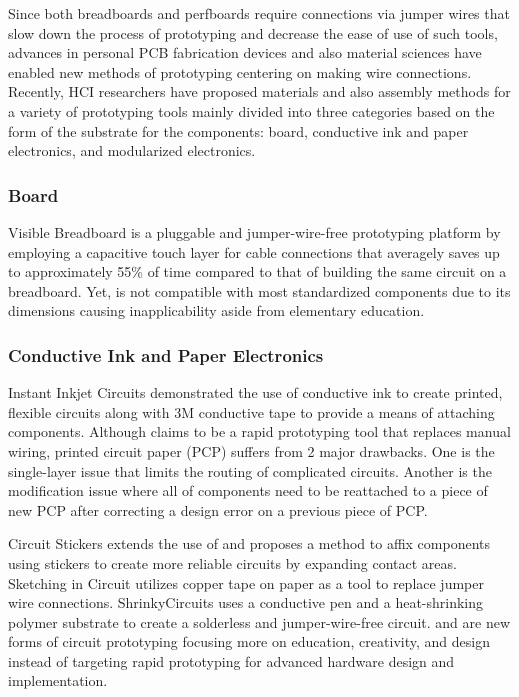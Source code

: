 Since both breadboards and perfboards require connections via jumper wires that slow down the process of prototyping and decrease the ease of use of such tools, advances in personal PCB fabrication devices and also material sciences have enabled new methods of prototyping centering on making wire connections.
Recently, HCI researchers have proposed materials and also assembly methods for a variety of prototyping tools mainly divided into three categories based on the form of the substrate for the components: board, conductive ink and paper electronics, and modularized electronics.

\subsubsection{Board}
Visible Breadboard \cite{Visible_Breadboard} is a pluggable and jumper-wire-free prototyping platform by employing a capacitive touch layer for cable connections that averagely saves up to approximately 55\% of time compared to that of building the same circuit on a breadboard. Yet, \cite{Visible_Breadboard} is not compatible with most standardized components due to its dimensions causing inapplicability aside from elementary education.

\subsubsection{Conductive Ink and Paper Electronics}
Instant Inkjet Circuits \cite{Instant_Inkjet_Circuits} demonstrated the use of conductive ink to create printed, flexible circuits along with 3M conductive tape to provide a means of attaching components. 
Although \cite{Instant_Inkjet_Circuits} claims to be a rapid prototyping tool that replaces manual wiring, printed circuit paper (PCP) suffers from 2 major drawbacks. One is the single-layer issue that limits the routing of complicated circuits. Another is the modification issue where all of components need to be reattached to a piece of new PCP after correcting a design error on a previous piece of PCP.

Circuit Stickers \cite{Circuit_Stickers} extends the use of \cite{Instant_Inkjet_Circuits} and proposes a method to affix components using stickers to create more reliable circuits by expanding contact areas.
Sketching in Circuit \cite{Sketching_in_Circuits} utilizes copper tape on paper as a tool to replace jumper wire connections.
ShrinkyCircuits \cite{ShrinkyCircuits} uses a conductive pen and a heat-shrinking polymer substrate to create a solderless and jumper-wire-free circuit.
\cite{Sketching_in_Circuits} and \cite{ShrinkyCircuits} are new forms of circuit prototyping focusing more on education, creativity, and design instead of targeting rapid prototyping for advanced hardware design and implementation.

